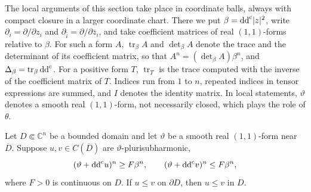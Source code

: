 The local arguments of this section take place in coordinate balls, always with compact closure in a larger coordinate chart. There we put $\beta=\mathrm{dd}^{\mathrm{c}}|z|^2$, write $\partial_i=\partial/\partial z_i$ and $\partial_{\bar i}=\partial/\partial\bar z_i$, and take coefficient matrices of real $(1,1)$-forms relative to $\beta$. For such a form $A$, $\operatorname{tr}_\beta A$ and $\det_\beta A$ denote the trace and the determinant of its coefficient matrix, so that $A^n=(\det_\beta A)\beta^n$, and $\Delta_\beta=\operatorname{tr}_\beta\mathrm{dd}^{\mathrm{c}}$. For a positive form $T$, $\operatorname{tr}_T$ is the trace computed with the inverse of the coefficient matrix of $T$. Indices run from $1$ to $n$, repeated indices in tensor expressions are summed, and $I$ denotes the identity matrix. In local statements, $\vartheta$ denotes a smooth real $(1,1)$-form, not necessarily closed, which plays the role of $\theta$.

\begin{proposition}\label{prop:interior-comparison}
Let $D\Subset\mathbb C^n$ be a bounded domain and let $\vartheta$ be a smooth real $(1,1)$-form near $\overline D$. Suppose $u,v\in C(\overline D)$ are $\vartheta$-plurisubharmonic,
\[
  (\vartheta+\mathrm{dd}^{\mathrm{c}} u)^n\geq F\beta^n,
  \qquad
  (\vartheta+\mathrm{dd}^{\mathrm{c}} v)^n\leq F\beta^n,
\]
where $F>0$ is continuous on $D$. If $u\leq v$ on $\partial D$, then $u\leq v$ in $D$.
\end{proposition}

